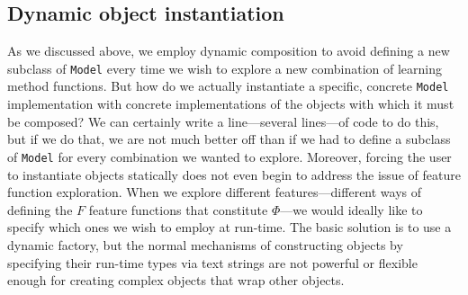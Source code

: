 \documentclass[a4paper]{article}
\begin{document}



























\subsection{Dynamic object instantiation}

As we discussed above, we employ dynamic composition to avoid defining
a new subclass of \texttt{Model} every time we wish to explore a new
combination of learning method functions. But how do we actually instantiate
a specific, concrete \texttt{Model} implementation with concrete implementations
of the objects with which it must be composed? We can certainly write
a line---several lines---of code to do this, but if we do that, we
are not much better off than if we had to define a subclass of \texttt{Model}
for every combination we wanted to explore. Moreover, forcing the
user to instantiate objects statically does not even begin to address
the issue of feature function exploration. When we explore different
features---different ways of defining the $F$ feature functions that
constitute $\Phi$---we would ideally like to specify which ones we
wish to employ at run-time.  The basic solution is to use a dynamic factory, but the normal mechanisms of constructing objects by specifying their run-time types via text strings are not powerful or flexible enough for creating complex objects that wrap other objects.
\end{document}
